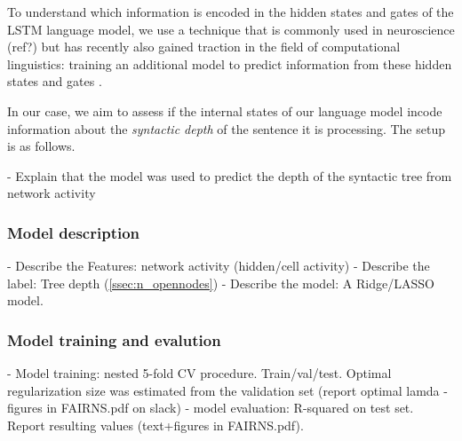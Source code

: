 To understand which information is encoded in the hidden states and gates of the LSTM language model, we use a technique that is commonly used in neuroscience (ref?) but has recently also gained traction in the field of computational linguistics: training an additional model to predict information from these hidden states and gates \cite{Adi:etal:2017,Hupkes:etal:2017}.  

In our case, we aim to assess if the internal states of our language model incode information about the \textit{syntactic depth} of the sentence it is processing.
The setup is as follows.

- Explain that the model was used to predict the depth of the syntactic tree from network activity
\subsubsection{Model description}
- Describe the Features: network activity (hidden/cell activity)
- Describe the label: Tree depth (\ref{ssec:n_opennodes})
- Describe the model: A Ridge/LASSO model.
\subsubsection{Model training and evalution}
- Model training: nested 5-fold CV procedure. Train/val/test. Optimal regularization size was estimated from the validation set (report optimal lamda - figures in FAIRNS.pdf on slack)
- model evaluation: R-squared on test set. Report resulting values (text+figures in FAIRNS.pdf). 


